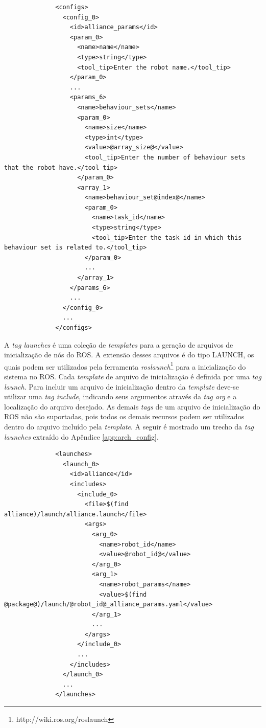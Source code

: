             \begin{lstlisting}
              <configs>
                <config_0>
                  <id>alliance_params</id>
                  <param_0>
                    <name>name</name>
                    <type>string</type>
                    <tool_tip>Enter the robot name.</tool_tip>
                  </param_0>
                  ...
                  <params_6>
                    <name>behaviour_sets</name>
                    <param_0>
                      <name>size</name>
                      <type>int</type>
                      <value>@array_size@</value>
                      <tool_tip>Enter the number of behaviour sets that the robot have.</tool_tip>
                    </param_0>
                    <array_1>
                      <name>behaviour_set@index@</name>
                      <param_0>
                        <name>task_id</name>
                        <type>string</type>
                        <tool_tip>Enter the task id in which this behaviour set is related to.</tool_tip>
                      </param_0>
                      ...
                    </array_1>
                  </params_6>
                  ...
                </config_0>
                ...
              </configs>
            \end{lstlisting}
            
            A \textit{tag launches} é uma coleção de \textit{templates} para a geração de arquivos de inicialização de nós do ROS. A extensão desses arquivos é do tipo LAUNCH, os quais podem ser utilizados pela ferramenta \textit{roslaunch}\footnote{http://wiki.ros.org/roslaunch} para a inicialização do sistema no ROS. Cada \textit{template} de arquivo de inicialização é definida por uma \textit{tag launch}. Para incluir um arquivo de inicialização dentro da \textit{template} deve-se utilizar uma \textit{tag include}, indicando seus argumentos através da \textit{tag arg} e a localização do arquivo desejado. As demais \textit{tags} de um arquivo de inicialização do ROS não são suportadas, pois todos os demais recursos podem ser utilizados dentro do arquivo incluído pela \textit{template}. A seguir é mostrado um trecho da \textit{tag launches} extraído do Apêndice \ref{app:arch_config}.
            
            \begin{lstlisting}
              <launches>
                <launch_0>
                  <id>alliance</id>
                  <includes>
                    <include_0>
                      <file>$(find alliance)/launch/alliance.launch</file>
                      <args>
                        <arg_0>
                          <name>robot_id</name>
                          <value>@robot_id@</value>
                        </arg_0>
                        <arg_1>
                          <name>robot_params</name>
                          <value>$(find @package@)/launch/@robot_id@_alliance_params.yaml</value>
                        </arg_1>
                        ...
                      </args>
                    </include_0>
                    ...
                  </includes>
                </launch_0>
                ...
              </launches>
            \end{lstlisting}
            
